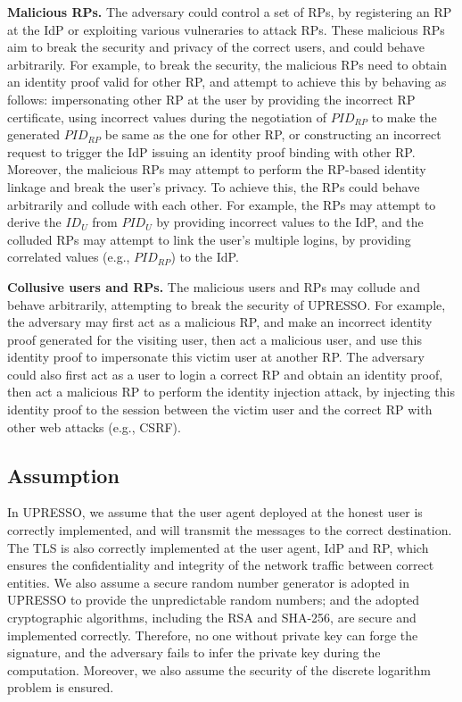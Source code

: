 \vspace{1mm}\noindent \textbf{Malicious RPs.} 
The adversary could control a set of RPs, by registering an RP at the IdP or exploiting various vulneraries to attack RPs.
These malicious RPs aim to break the security and privacy of the correct users, and could behave arbitrarily.
For example, to break the security, the malicious RPs need to obtain an identity proof valid for other RP, and attempt to achieve this by behaving as follows:
 impersonating other RP at the user by providing the incorrect RP certificate,
 using incorrect values during the negotiation of  $PID_{RP}$ to make  the generated $PID_{RP}$ be same as the one for other RP,
 or constructing an incorrect request to trigger the IdP issuing an identity proof binding with other RP.
Moreover, the malicious RPs may attempt to perform the RP-based identity linkage and break the user's privacy.
To achieve this, the RPs could  behave arbitrarily and collude with each other.
For example, the RPs may attempt to derive the $ID_U$ from $PID_U$ by providing incorrect values to the IdP,
 and the colluded RPs may attempt to link the user's multiple logins, by providing correlated values (e.g., $PID_{RP}$) to the IdP.

\vspace{1mm}\noindent \textbf{Collusive users and RPs.} %
The malicious users and RPs may collude and behave arbitrarily, attempting to break the security of UPRESSO.
For example, 
the adversary may first act as a malicious RP, and make an incorrect identity proof generated for the visiting user,
  then act a malicious user, and use this identity proof to impersonate this victim user at another RP.
The adversary could also first act as a user to login a correct RP and obtain an identity proof,
 then act a malicious RP to perform the identity injection attack, by injecting this identity proof to the session between the victim user and the correct RP with other web attacks (e.g., CSRF).


\subsection{Assumption}
In UPRESSO, 
we assume that the user agent deployed at the honest user is correctly implemented,
and will transmit the messages to the correct destination. 
The TLS is also correctly implemented at the user agent, IdP and RP, which ensures the confidentiality and integrity of the network traffic between correct entities.
We also assume a secure random number generator is adopted in UPRESSO to provide the unpredictable random numbers;
and the adopted cryptographic algorithms, including the RSA and SHA-256, are secure and implemented correctly.
Therefore,  no one without private key can forge the signature, and the adversary fails to infer the private key during the computation.
Moreover, we also assume the security of the discrete logarithm problem is ensured.

